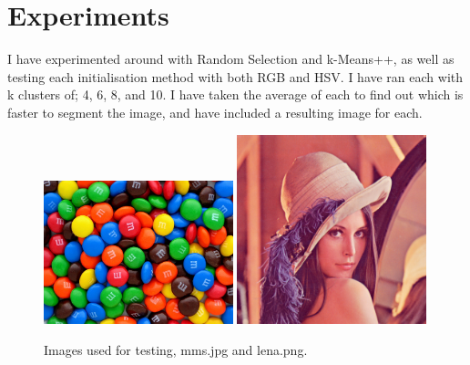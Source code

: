 \documentclass{article}
\begin{document}

\section{Experiments}

I have experimented around with Random Selection and k-Means++, as well as
testing each initialisation method with both RGB and HSV. I have ran each with k
clusters of; 4, 6, 8, and 10. I have taken the average of each to find out which
is faster to segment the image, and have included a resulting image for each.\\

\begin{figure}[ht]
\begin{center}
\includegraphics[width=0.49\textwidth]{images/mms}
\includegraphics[width=0.49\textwidth]{images/lena}
\caption{Images used for testing, mms.jpg and lena.png.}
\label{fig:testImages}
\end{center}
\end{figure}
\end{document}
